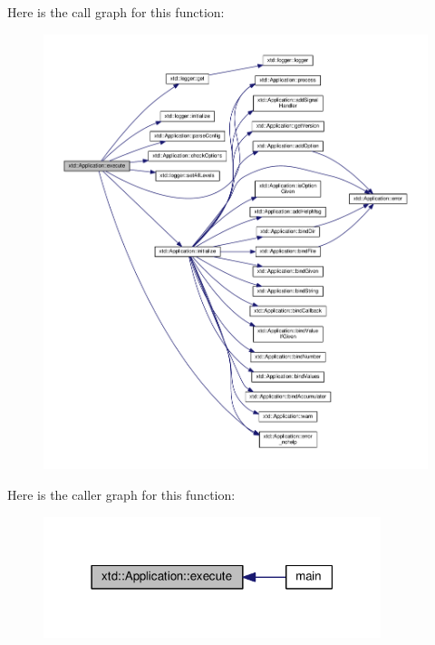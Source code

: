 Here is the call graph for this function\+:
\nopagebreak
\begin{figure}[H]
\begin{center}
\leavevmode
\includegraphics[width=350pt]{classxtd_1_1Application_ae9241351a9caefa4b96bc906d3db144c_cgraph}
\end{center}
\end{figure}




Here is the caller graph for this function\+:
\nopagebreak
\begin{figure}[H]
\begin{center}
\leavevmode
\includegraphics[width=279pt]{classxtd_1_1Application_ae9241351a9caefa4b96bc906d3db144c_icgraph}
\end{center}
\end{figure}


